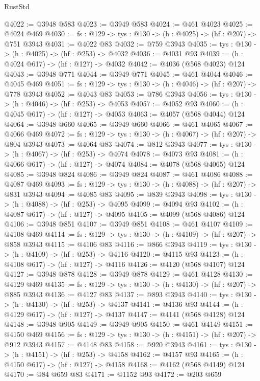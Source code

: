 \begin{lexlean}{RustStd}
\begin{coremodule}
{\begin{coremodule}
{{{{{{{{{{{{{{{@4022 := @3948 @583
@4023 := @3949 @583
@4024 := @461 @4023
@4025 := @4024 @469
@4030 := {fs : @129} -> {tys : @130} -> (h : @4025) -> (hf : @207) -> @751 @3943
@4031 := @4022 @83
@4032 := @759 @3943
@4035 := {tys : @130} -> (h : @4025) -> (hf : @253) -> @4032
@4036 := @4031 @93
@4039 := (h : @4024 @617) -> (hf : @127) -> @4032
@4042 := @4036 (@568 @4023) @124
@4043 := @3948 @771
@4044 := @3949 @771
@4045 := @461 @4044
@4046 := @4045 @469
@4051 := {fs : @129} -> {tys : @130} -> (h : @4046) -> (hf : @207) -> @778 @3943
@4052 := @4043 @83
@4053 := @786 @3943
@4056 := {tys : @130} -> (h : @4046) -> (hf : @253) -> @4053
@4057 := @4052 @93
@4060 := (h : @4045 @617) -> (hf : @127) -> @4053
@4063 := @4057 (@568 @4044) @124
@4064 := @3948 @660
@4065 := @3949 @660
@4066 := @461 @4065
@4067 := @4066 @469
@4072 := {fs : @129} -> {tys : @130} -> (h : @4067) -> (hf : @207) -> @804 @3943
@4073 := @4064 @83
@4074 := @812 @3943
@4077 := {tys : @130} -> (h : @4067) -> (hf : @253) -> @4074
@4078 := @4073 @93
@4081 := (h : @4066 @617) -> (hf : @127) -> @4074
@4084 := @4078 (@568 @4065) @124
@4085 := @3948 @824
@4086 := @3949 @824
@4087 := @461 @4086
@4088 := @4087 @469
@4093 := {fs : @129} -> {tys : @130} -> (h : @4088) -> (hf : @207) -> @831 @3943
@4094 := @4085 @83
@4095 := @839 @3943
@4098 := {tys : @130} -> (h : @4088) -> (hf : @253) -> @4095
@4099 := @4094 @93
@4102 := (h : @4087 @617) -> (hf : @127) -> @4095
@4105 := @4099 (@568 @4086) @124
@4106 := @3948 @851
@4107 := @3949 @851
@4108 := @461 @4107
@4109 := @4108 @469
@4114 := {fs : @129} -> {tys : @130} -> (h : @4109) -> (hf : @207) -> @858 @3943
@4115 := @4106 @83
@4116 := @866 @3943
@4119 := {tys : @130} -> (h : @4109) -> (hf : @253) -> @4116
@4120 := @4115 @93
@4123 := (h : @4108 @617) -> (hf : @127) -> @4116
@4126 := @4120 (@568 @4107) @124
@4127 := @3948 @878
@4128 := @3949 @878
@4129 := @461 @4128
@4130 := @4129 @469
@4135 := {fs : @129} -> {tys : @130} -> (h : @4130) -> (hf : @207) -> @885 @3943
@4136 := @4127 @83
@4137 := @893 @3943
@4140 := {tys : @130} -> (h : @4130) -> (hf : @253) -> @4137
@4141 := @4136 @93
@4144 := (h : @4129 @617) -> (hf : @127) -> @4137
@4147 := @4141 (@568 @4128) @124
@4148 := @3948 @905
@4149 := @3949 @905
@4150 := @461 @4149
@4151 := @4150 @469
@4156 := {fs : @129} -> {tys : @130} -> (h : @4151) -> (hf : @207) -> @912 @3943
@4157 := @4148 @83
@4158 := @920 @3943
@4161 := {tys : @130} -> (h : @4151) -> (hf : @253) -> @4158
@4162 := @4157 @93
@4165 := (h : @4150 @617) -> (hf : @127) -> @4158
@4168 := @4162 (@568 @4149) @124
@4170 := @84 @659 @83
@4171 := @1152 @93
@4172 := @203 @659
}}}}}}}}}}}}}}}
\end{coremodule}}
\end{coremodule}
\end{lexlean}
